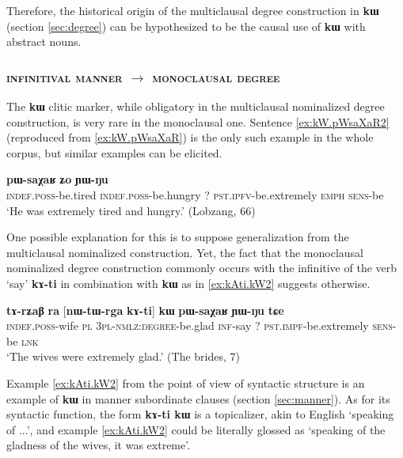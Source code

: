 \documentclass[oldfontcommands,oneside,a4paper,11pt]{article}
\newcommand{\ipa}[1]{{\phon\textbf{#1}}}
\begin{document}
Therefore, the historical origin of the multiclausal   degree construction in \ipa{kɯ}   (section \ref{sec:degree})   can be hypothesized to be  the causal use of \ipa{kɯ}   with abstract nouns.  

 
 \subsubsection{ \textsc{infinitival manner} $\rightarrow$  \textsc{monoclausal degree}} \label{sec:manner2adj}
The  \ipa{kɯ} clitic marker, while obligatory in the multiclausal nominalized degree construction, is very rare in the monoclausal one. Sentence \ref{ex:kW.pWsaXaR2}  (reproduced from \ref{ex:kW.pWsaXaR}) is the only such example in the whole corpus, but similar examples can be elicited.

      \begin{exe}
  \ex  \label{ex:kW.pWsaXaR2}  
  \gll 
   [\ipa{tɤ-ɣɲat}  	\ipa{tɤ-mtsɯr}]  	\ipa{kɯ}  	\ipa{pɯ-saχaʁ}  	\ipa{ʑo}  	\ipa{ɲɯ-ŋu}  \\
      \textsc{indef.poss}-be.tired     \textsc{indef.poss}-be.hungry ?{ } \textsc{pst.ipfv}-be.extremely \textsc{emph} \textsc{sens}-be \\
      \glt `He was extremely tired and hungry.' (Lobzang, 66)
   \end{exe} 

One possible explanation for this is to suppose generalization from the multiclausal nominalized construction. Yet, the fact that the monoclausal nominalized degree construction commonly occurs with the infinitive of the verb `say' \ipa{kɤ-ti} in combination with   \ipa{kɯ} as in \ref{ex:kAti.kW2}  suggests otherwise.
      \begin{exe}
  \ex  \label{ex:kAti.kW2}  
  \gll 
\ipa{tɤ-rʑaβ} 	\ipa{ra} 	 	[\ipa{nɯ-tɯ-rga} 	\ipa{kɤ-ti}] 	\ipa{kɯ} 	\ipa{pɯ-saχaʁ} 	\ipa{ɲɯ-ŋu} 	\ipa{tɕe} \\
\textsc{indef.poss}-wife \textsc{pl} \textsc{3pl-nmlz:degree}-be.glad \textsc{inf}-say ?{ } \textsc{pst.impf}-be.extremely \textsc{sens}-be \textsc{lnk} \\
\glt `The wives were extremely glad.' (The brides, 7)
   \end{exe} 
   
Example \ref{ex:kAti.kW2}  from the point of view of syntactic structure is an example of \ipa{kɯ} in manner subordinate clauses (section \ref{sec:manner}). As for its syntactic function, the form \ipa{kɤ-ti kɯ} is a topicalizer, akin to English  `speaking of ...', and example \ref{ex:kAti.kW2}  could be literally glossed as `speaking of the gladness of the wives, it was extreme'. 
 
\end{document}
